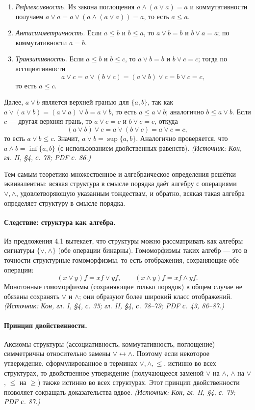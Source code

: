 \documentclass[a4paper,12pt]{article}
\begin{document}
\begin{enumerate}[label=(\arabic*)]
\item \emph{Рефлексивность.} Из закона поглощения \(a\wedge(a\vee a)=a\) и коммутативности получаем \(a\vee a=a\vee(a\wedge(a\vee a))=a\), то есть \(a\le a\).
\item \emph{Антисимметричность.} Если \(a\le b\) и \(b\le a\), то \(a\vee b=b\) и \(b\vee a=a\); по коммутативности \(a=b\).
\item \emph{Транзитивность.} Если \(a\le b\) и \(b\le c\), то \(a\vee b=b\) и \(b\vee c=c\); тогда по ассоциативности
\[
a\vee c=a\vee(b\vee c)=(a\vee b)\vee c=b\vee c=c,
\]
то есть \(a\le c\).
\end{enumerate}
Далее, \(a\vee b\) является верхней гранью для \(\{a,b\}\), так как \(a\vee(a\vee b)=(a\vee a)\vee b=a\vee b\), то есть \(a\le a\vee b\); аналогично \(b\le a\vee b\). Если \(c\) — другая верхняя грань, то \(a\vee c=c\) и \(b\vee c=c\), откуда
\[
(a\vee b)\vee c=a\vee(b\vee c)=a\vee c=c,
\]
то есть \(a\vee b\le c\). Значит, \(a\vee b=\sup\{a,b\}\). Аналогично проверяется, что \(a\wedge b=\inf\{a,b\}\) (с использованием двойственных равенств).
\textit{(Источник: Кон, гл. II, §4, с. 78; PDF с. 86.)}

Тем самым теоретико-множественное и алгебраическое определения решётки эквивалентны: всякая структура в смысле порядка даёт алгебру с операциями \(\vee,\wedge\), удовлетворяющую указанным тождествам, и обратно, всякая такая алгебра определяет структуру в смысле порядка.

\paragraph{Следствие: структура как алгебра.}
Из предложения 4.1 вытекает, что структуры можно рассматривать как алгебры сигнатуры \(\{\vee,\wedge\}\) (обе операции бинарны). Гомоморфизмы таких алгебр — это в точности структурные гомоморфизмы, то есть отображения, сохраняющие обе операции:
\[
(x\vee y)f=xf\vee yf,\qquad
(x\wedge y)f=xf\wedge yf.
\]
Монотонные гомоморфизмы (сохраняющие только порядок) в общем случае не обязаны сохранять \(\vee\) и \(\wedge\); они образуют более широкий класс отображений.
\textit{(Источник: Кон, гл. I, §4, с. 35; гл. II, §4, с. 78--79; PDF с. 43, 86--87.)}

\paragraph{Принцип двойственности.}
Аксиомы структуры (ассоциативность, коммутативность, поглощение) симметричны относительно замены \(\vee\leftrightarrow\wedge\). Поэтому если некоторое утверждение, сформулированное в терминах \(\vee,\wedge,\le\), истинно во всех структурах, то двойственное утверждение (получающееся заменой \(\vee\) на \(\wedge\), \(\wedge\) на \(\vee\), \(\le\) на \(\ge\)) также истинно во всех структурах. Этот принцип двойственности позволяет сокращать доказательства вдвое.
\textit{(Источник: Кон, гл. II, §4, с. 79; PDF с. 87.)}
\end{document}
